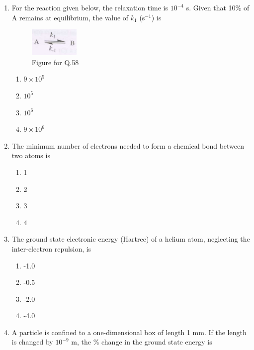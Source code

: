 \documentclass[12pt]{article}
\begin{document}
\begin{enumerate}
\item For the reaction given below, the relaxation time is $10^{-4}$ s. Given that 10\% of A remains at equilibrium, the value of $k_1$ (s$^{-1}$) is

\begin{figure}[H]
\includegraphics[width=0.3\columnwidth]{figs/q58.png}
\caption{Figure for Q.58}
    \label{fig:q58}
\end{figure}

\begin{enumerate}
\item $9 \times 10^5$
\item $10^5$
\item $10^6$
\item $9 \times 10^6$
\end{enumerate}    \hfill{}




\item The minimum number of electrons needed to form a chemical bond between two atoms is

\begin{enumerate}
\item 1
\item 2
\item 3
\item 4
\end{enumerate}    \hfill{}




\item The ground state electronic energy (Hartree) of a helium atom, neglecting the inter-electron repulsion, is

\begin{enumerate}
\item -1.0
\item -0.5
\item -2.0
\item -4.0
\end{enumerate}    \hfill{}




\item A particle is confined to a one-dimensional box of length 1 mm. If the length is changed by $10^{-9}$ m, the \% change in the ground state energy is


\end{enumerate}
\end{document}
